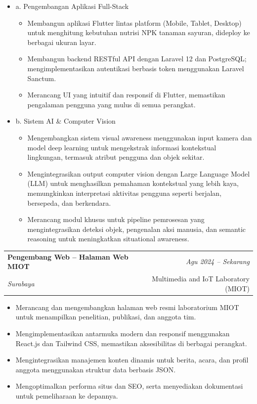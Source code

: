 \documentclass[a4paper,11pt]{article}
\makeatletter
\newcommand{\resumeSubheading}[4]{
\vspace{0.5mm}\item
    \begin{tabular*}{0.98\textwidth}[t]{l@{\extracolsep{\fill}}r}
        \textbf{#1} & \textit{\footnotesize{#4}} \\
        \textit{\footnotesize{#3}} &  \footnotesize{#2}\\
    \end{tabular*}
    \vspace{-2.4mm}
}
\newcommand{\resumeItemListStart}{\begin{justify}\begin{itemize}[leftmargin=3ex, rightmargin=2ex, noitemsep,labelsep=1.2mm,itemsep=0mm]\small}
\newcommand{\resumeItemListEnd}{\end{itemize}\end{justify}\vspace{-2mm}}
\makeatother
\begin{document}
\vspace{0mm}
\begin{itemize}[leftmargin=1.5ex, label={}]

\item{a. Pengembangan Aplikasi Full-Stack}
    \begin{itemize}[label=-]
        \item {Membangun aplikasi Flutter lintas platform (Mobile, Tablet, Desktop) untuk menghitung kebutuhan nutrisi NPK tanaman sayuran, dideploy ke berbagai ukuran layar.}
        \item {Membangun backend RESTful API dengan Laravel 12 dan PostgreSQL; mengimplementasikan autentikasi berbasis token menggunakan Laravel Sanctum.}
        \item {Merancang UI yang intuitif dan responsif di Flutter, memastikan pengalaman pengguna yang mulus di semua perangkat.}
    \end{itemize}

\item{b. Sistem AI \& Computer Vision}
    \begin{itemize}[label=-]
        \item {Mengembangkan sistem visual awareness menggunakan input kamera dan model deep learning untuk mengekstrak informasi kontekstual lingkungan, termasuk atribut pengguna dan objek sekitar.}
        \item {Mengintegrasikan output computer vision dengan Large Language Model (LLM) untuk menghasilkan pemahaman kontekstual yang lebih kaya, memungkinkan interpretasi aktivitas pengguna seperti berjalan, bersepeda, dan berkendara.}
        \item {Merancang modul khusus untuk pipeline pemrosesan yang mengintegrasikan deteksi objek, pengenalan aksi manusia, dan semantic reasoning untuk meningkatkan situational awareness.}
    \end{itemize}
\end{itemize}

\vspace{-2mm}
\resumeSubheading
{Pengembang Web -- Halaman Web MIOT}
{Multimedia and IoT Laboratory (MIOT)}
{Surabaya}{Agu 2024 -- Sekarang}
\resumeItemListStart
\item {Merancang dan mengembangkan halaman web resmi laboratorium MIOT untuk menampilkan penelitian, publikasi, dan anggota tim.}
\item {Mengimplementasikan antarmuka modern dan responsif menggunakan React.js dan Tailwind CSS, memastikan aksesibilitas di berbagai perangkat.}
\item {Mengintegrasikan manajemen konten dinamis untuk berita, acara, dan profil anggota menggunakan struktur data berbasis JSON.}
\item {Mengoptimalkan performa situs dan SEO, serta menyediakan dokumentasi untuk pemeliharaan ke depannya.}
\resumeItemListEnd
\end{document}
